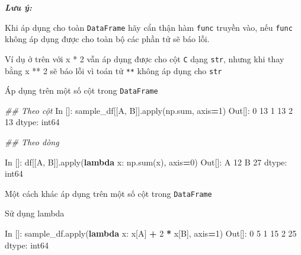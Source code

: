 \documentclass[
]{book}
\makeatletter
\newenvironment{Shaded}{\begin{snugshade}}{\end{snugshade}}
\newcommand{\BuiltInTok}[1]{#1}
\newcommand{\CommentTok}[1]{\textcolor[rgb]{0.56,0.35,0.01}{\textit{#1}}}
\newcommand{\DecValTok}[1]{\textcolor[rgb]{0.00,0.00,0.81}{#1}}
\newcommand{\KeywordTok}[1]{\textcolor[rgb]{0.13,0.29,0.53}{\textbf{#1}}}
\newcommand{\NormalTok}[1]{#1}
\newcommand{\OperatorTok}[1]{\textcolor[rgb]{0.81,0.36,0.00}{\textbf{#1}}}
\newcommand{\StringTok}[1]{\textcolor[rgb]{0.31,0.60,0.02}{#1}}
\newenvironment{kframe}{%
\medskip{}
\setlength{\fboxsep}{.8em}
 \def\at@end@of@kframe{}%
 \ifinner\ifhmode%
  \def\at@end@of@kframe{\end{minipage}}%
  \begin{minipage}{\columnwidth}%
 \fi\fi%
 \def\FrameCommand##1{\hskip\@totalleftmargin \hskip-\fboxsep
 \colorbox{shadecolor}{##1}\hskip-\fboxsep
     \hskip-\linewidth \hskip-\@totalleftmargin \hskip\columnwidth}%
 \MakeFramed {\advance\hsize-\width
   \@totalleftmargin\z@ \linewidth\hsize
   \@setminipage}}%
 {\par\unskip\endMakeFramed%
 \at@end@of@kframe}
\newenvironment{rmdblock}[1]
  {
  \begin{itemize}
  \renewcommand{\labelitemi}{
    \raisebox{-.7\height}[0pt][0pt]{
      {\setkeys{Gin}{width=3em,keepaspectratio}\texttt{[image: images/\#1]}}
    }
  }
  \setlength{\fboxsep}{1em}
  \begin{kframe}
  \item
  }
  {
  \end{kframe}
  \end{itemize}
  }
\newenvironment{rmdnote}
  {\begin{rmdblock}{note}}
  {\end{rmdblock}}
\makeatother
\begin{document}
\begin{rmdnote}
\textbf{\emph{Lưu ý:}}

Khi áp dụng cho toàn \texttt{DataFrame} hãy cẩn thận hàm \texttt{func} truyền vào, nếu \texttt{func} không áp dụng được cho toàn bộ các phần tử sẽ báo lỗi.

Ví dụ ở trên với x * 2 vẫn áp dụng được cho cột \texttt{C} dạng \texttt{str}, nhưng khi thay bằng x ** 2 sẽ báo lỗi vì toán tử \texttt{**} không áp dụng cho \texttt{str}
\end{rmdnote}

Áp dụng trên một số cột trong \texttt{DataFrame}

\begin{Shaded}
\begin{Highlighting}[]
\CommentTok{\#\# Theo cột}
\NormalTok{In []: sample\_df[[}\StringTok{\textquotesingle{}A\textquotesingle{}}\NormalTok{, }\StringTok{\textquotesingle{}B\textquotesingle{}}\NormalTok{]].}\BuiltInTok{apply}\NormalTok{(np.}\BuiltInTok{sum}\NormalTok{, axis}\OperatorTok{=}\DecValTok{1}\NormalTok{)}
\NormalTok{Out[]:}
\DecValTok{0}    \DecValTok{13}
\DecValTok{1}    \DecValTok{13}
\DecValTok{2}    \DecValTok{13}
\NormalTok{dtype: int64}

\CommentTok{\#\# Theo dòng}

\NormalTok{In []: df[[}\StringTok{\textquotesingle{}A\textquotesingle{}}\NormalTok{, }\StringTok{\textquotesingle{}B\textquotesingle{}}\NormalTok{]].}\BuiltInTok{apply}\NormalTok{(}\KeywordTok{lambda}\NormalTok{ x: np.}\BuiltInTok{sum}\NormalTok{(x), axis}\OperatorTok{=}\DecValTok{0}\NormalTok{)}
\NormalTok{Out[]:}
\NormalTok{A    }\DecValTok{12}
\NormalTok{B    }\DecValTok{27}
\NormalTok{dtype: int64}
\end{Highlighting}
\end{Shaded}

Một cách khác áp dụng trên một số cột trong \texttt{DataFrame}

Sử dụng lambda

\begin{Shaded}
\begin{Highlighting}[]
\NormalTok{In []: sample\_df.}\BuiltInTok{apply}\NormalTok{(}\KeywordTok{lambda}\NormalTok{ x: x[}\StringTok{\textquotesingle{}A\textquotesingle{}}\NormalTok{] }\OperatorTok{+} \DecValTok{2} \OperatorTok{*}\NormalTok{ x[}\StringTok{\textquotesingle{}B\textquotesingle{}}\NormalTok{], axis}\OperatorTok{=}\DecValTok{1}\NormalTok{)}
\NormalTok{Out[]: }
\DecValTok{0}     \DecValTok{5}
\DecValTok{1}    \DecValTok{15}
\DecValTok{2}    \DecValTok{25}
\NormalTok{dtype: int64}
\end{Highlighting}
\end{Shaded}
\end{document}
